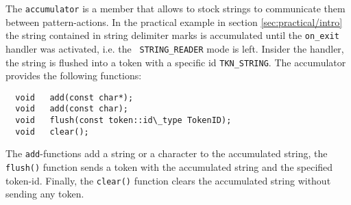 The {\tt accumulator} is a member that allows to stock strings to communicate
them between pattern-actions. In the practical example in section
\ref{sec:practical/intro} the string contained in string delimiter marks is
accumulated until the {\tt on\_exit} handler was activated, i.e. the {\tt
    STRING\_READER} mode is left. Insider the handler, the string is flushed
    into a token with a specific id {\tt TKN\_STRING}.  The accumulator
    provides the following functions:

\begin{lstlisting}
  void   add(const char*);                  
  void   add(const char);                    
  void   flush(const token::id\_type TokenID);
  void   clear(); 
\end{lstlisting}

The {\tt add}-functions add a string or a character to the accumulated string,
the {\tt flush()} function sends a token with the accumulated string and the
specified token-id. Finally, the {\tt clear()} function clears the accumulated
string without sending any token.

